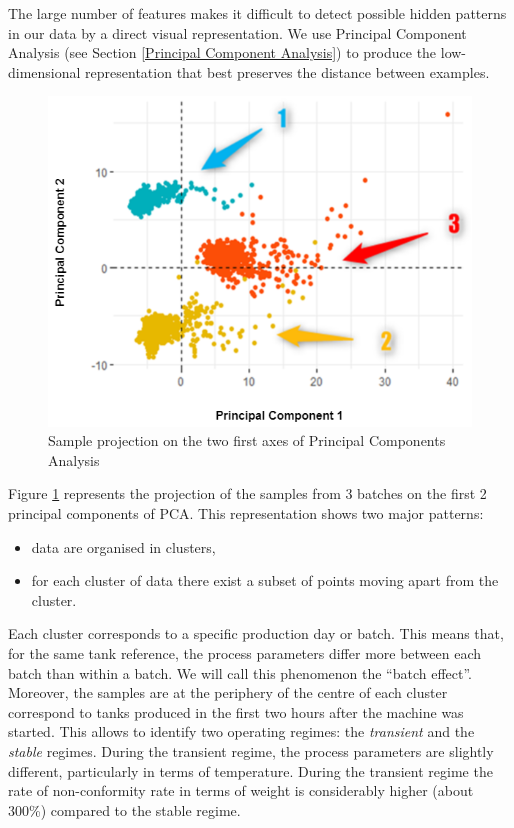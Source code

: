 The large number of features makes it difficult to detect possible hidden patterns in our data by a direct visual representation. We use Principal Component Analysis (see Section \ref{Principal Component Analysis}) to produce the low-dimensional representation that best preserves the distance between examples. 
%
\begin{figure}
\centerline{\includegraphics[scale=0.5]{images/chapter_3/PCA.png}}
\caption{Sample projection on the two first axes of Principal Components Analysis}
\label{fig:pca}
\end{figure}
%
Figure \ref{fig:pca} represents the projection of the samples from 3 batches on the first 2 principal components of PCA. This representation shows two major patterns:
\begin{itemize}
    \item data are organised in clusters,
    \item for each cluster of data there exist a subset of points moving apart from the cluster.
\end{itemize}
%
Each cluster corresponds to a specific production day or batch. This means that, for the same tank reference, the process parameters differ more between each batch than within a batch. We will call this phenomenon the ``batch effect''. Moreover, the samples are at the periphery of the centre of each cluster correspond to tanks produced in the first two hours after the machine was started. This allows to identify two operating regimes: the \textit{transient} and the \textit{stable} regimes. During the transient regime, the process parameters are slightly different, particularly in terms of temperature. During the transient regime the rate of non-conformity rate in terms of weight is considerably higher (about 300\%) compared to the stable regime.    

